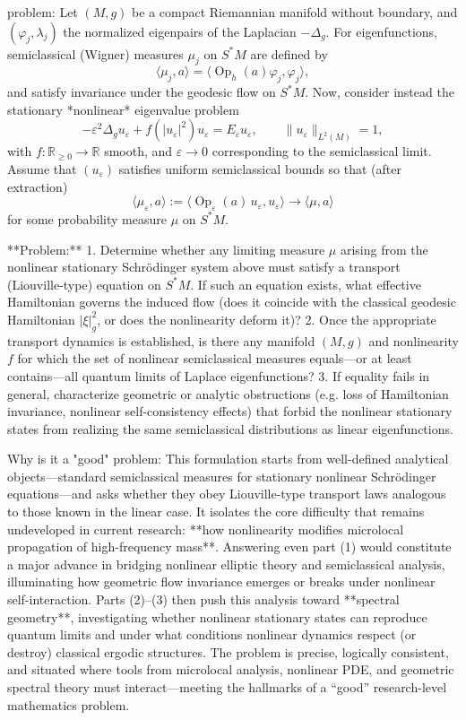 problem:  
Let \((M,g)\) be a compact Riemannian manifold without boundary, and \((\varphi_j,\lambda_j)\) the normalized eigenpairs of the Laplacian \(-\Delta_g\).  
For eigenfunctions, semiclassical (Wigner) measures \(\mu_j\) on \(S^*M\) are defined by  
\[
\langle \mu_j, a \rangle = \langle \operatorname{Op}_h(a)\varphi_j,\varphi_j\rangle,
\]
and satisfy invariance under the geodesic flow on \(S^*M\).  
Now, consider instead the stationary *nonlinear* eigenvalue problem
\[
-\varepsilon^2\Delta_g u_\varepsilon + f(|u_\varepsilon|^2)u_\varepsilon = E_\varepsilon u_\varepsilon,
\qquad \|u_\varepsilon\|_{L^2(M)}=1,
\]
with \(f:\mathbb{R}_{\ge0}\to\mathbb{R}\) smooth, and \(\varepsilon\to 0\) corresponding to the semiclassical limit.  
Assume that \((u_\varepsilon)\) satisfies uniform semiclassical bounds so that (after extraction)  
\[
\langle \mu_\varepsilon, a\rangle := \langle \operatorname{Op}_\varepsilon(a)\,u_\varepsilon, u_\varepsilon\rangle \to \langle \mu,a\rangle
\]
for some probability measure \(\mu\) on \(S^*M\).  

**Problem:**  
1. Determine whether any limiting measure \(\mu\) arising from the nonlinear stationary Schrödinger system above must satisfy a transport (Liouville-type) equation on \(S^*M\). If such an equation exists, what effective Hamiltonian governs the induced flow (does it coincide with the classical geodesic Hamiltonian \(|\xi|_g^2\), or does the nonlinearity deform it)?  
2. Once the appropriate transport dynamics is established, is there any manifold \((M,g)\) and nonlinearity \(f\) for which the set of nonlinear semiclassical measures equals—or at least contains—all quantum limits of Laplace eigenfunctions?  
3. If equality fails in general, characterize geometric or analytic obstructions (e.g. loss of Hamiltonian invariance, nonlinear self-consistency effects) that forbid the nonlinear stationary states from realizing the same semiclassical distributions as linear eigenfunctions.  

Why is it a "good" problem:  
This formulation starts from well-defined analytical objects—standard semiclassical measures for stationary nonlinear Schrödinger equations—and asks whether they obey Liouville-type transport laws analogous to those known in the linear case.  It isolates the core difficulty that remains undeveloped in current research: **how nonlinearity modifies microlocal propagation of high-frequency mass**.  
Answering even part (1) would constitute a major advance in bridging nonlinear elliptic theory and semiclassical analysis, illuminating how geometric flow invariance emerges or breaks under nonlinear self-interaction.  
Parts (2)–(3) then push this analysis toward **spectral geometry**, investigating whether nonlinear stationary states can reproduce quantum limits and under what conditions nonlinear dynamics respect (or destroy) classical ergodic structures.  
The problem is precise, logically consistent, and situated where tools from microlocal analysis, nonlinear PDE, and geometric spectral theory must interact—meeting the hallmarks of a “good” research-level mathematics problem.